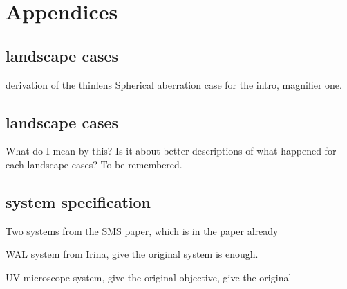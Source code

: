 \chapter{Appendices} %
\label{Appendices} %
\graphicspath{ {./Appendix/figures/} }  %
\captionsetup[figure]{labelfont=bf}
\captionsetup{margin=1.5em}
\captionsetup[table]{labelfont=bf}





\section{landscape cases}
derivation of the thinlens Spherical aberration case for the intro, magnifier one. 

\section{landscape cases}
What do I mean by this? Is it about better descriptions of what happened for each landscape cases? To be remembered. 

\section{system specification}
\item Two systems from the SMS paper, which is in the paper already
\item WAL system from Irina, give the original system is enough.
\item UV microscope system, give the original 
\DUV objective, give the original

